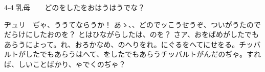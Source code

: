 \documentclass[tate,paper=b6j,jafontsize=9pt]{jlreq}
\begin{document}
\begin{azconvIndented}{4\zw}{-4\zw}
乳母　　どのをしたをおはうはうでな？

ヂュリ　ぢゃ、ううてならうか！ あゝ、、どのでッこうせうぞ、ついがうたのでだらけにしたおのを？ とはひながらしたは、のを？ さア、おをばめがしたでもあらうによって。れ、おろかなめ、のへりをれ。にぐるをへてにせをる。チッバルトがしたでもあらうはへて、をしたでもあらうチッバルトがんだのぢゃ。すれば、しいことばかり、ゃでくのぢゃ？ 
\end{azconvIndented}
\end{document}
